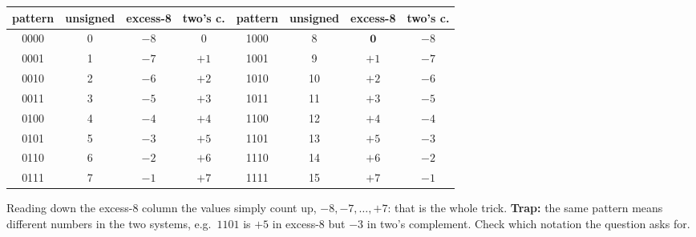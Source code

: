 \documentclass{fkt-notes}
\begin{document}
\begin{center}
  \small
  \begin{tabular}{@{}cccc@{\qquad}cccc@{}}
    \toprule
    pattern & unsigned & \textbf{excess-8} & two's c. & pattern & unsigned & \textbf{excess-8} & two's c. \\
    \midrule
    0000 & 0 & $-8$ & $0$    & 1000 & 8  & $\mathbf{0}$ & $-8$ \\
    0001 & 1 & $-7$ & $+1$   & 1001 & 9  & $+1$ & $-7$ \\
    0010 & 2 & $-6$ & $+2$   & 1010 & 10 & $+2$ & $-6$ \\
    0011 & 3 & $-5$ & $+3$   & 1011 & 11 & $+3$ & $-5$ \\
    0100 & 4 & $-4$ & $+4$   & 1100 & 12 & $+4$ & $-4$ \\
    0101 & 5 & $-3$ & $+5$   & 1101 & 13 & $+5$ & $-3$ \\
    0110 & 6 & $-2$ & $+6$   & 1110 & 14 & $+6$ & $-2$ \\
    0111 & 7 & $-1$ & $+7$   & 1111 & 15 & $+7$ & $-1$ \\
    \bottomrule
  \end{tabular}
\end{center}
Reading down the excess-8 column the values simply count up, $-8,-7,\dots,+7$:
that is the whole trick. \textbf{Trap:} the same pattern means different numbers in
the two systems, e.g.\ $1101$ is $+5$ in excess-8 but $-3$ in two's complement.
Check which notation the question asks for.
\end{document}
